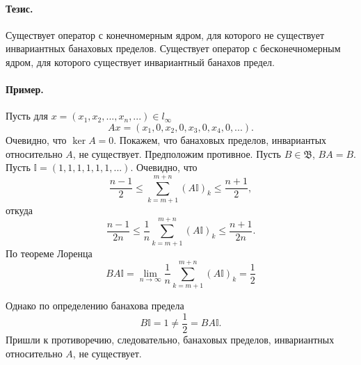 \documentclass[a4paper,14pt]{article} %
\begin{document}

\paragraph{Тезис.}
Существует оператор с конечномерным ядром, для которого не существует инвариантных банаховых пределов.
Существует оператор с бесконечномерным ядром, для которого существует инвариантный банахов предел.

\paragraph{Пример.}

Пусть для $x = (x_1, x_2, ..., x_n, ...)\in l_\infty$
\begin{equation}
	Ax = (x_1, 0, x_2, 0, x_3, 0, x_4, 0, ...).
\end{equation}
Очевидно, что $\ker A = {0}$.
Покажем, что банаховых пределов, инвариантых относительно $A$, не существует.
Предположим противное.
Пусть $B\in\mathfrak{B}$, $BA = B$.
Пусть $\mathbb{I} = (1, 1, 1, 1, 1, 1, ...)$.
Очевидно, что
%
\begin{equation}
	\frac{n-1}{2}\leqslant \sum_{k=m+1}^{m+n} (A\mathbb{I})_k \leqslant \frac{n+1}{2},
\end{equation}
откуда
\begin{equation}
	\frac{n-1}{2n}\leqslant \frac{1}{n}\sum_{k=m+1}^{m+n} (A\mathbb{I})_k \leqslant \frac{n+1}{2n}.
\end{equation}
По теореме Лоренца
\begin{equation}
	BA\mathbb{I} = 
	\lim_{n\to\infty} \frac{1}{n}\sum_{k=m+1}^{m+n} (A\mathbb{I})_k = \frac{1}{2}
\end{equation}

Однако по определению банахова предела
\begin{equation}
	B\mathbb{I} = 1 \neq \frac{1}{2} = BA\mathbb{I}.
\end{equation}
Пришли к противоречию, следовательно, банаховых пределов, инвариантных относительно $A$, не существует.
\end{document}
